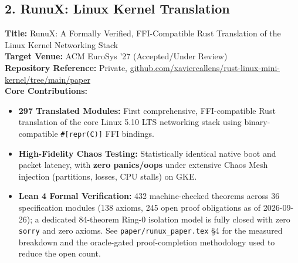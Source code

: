 \documentclass[11pt,a4paper]{article}
\begin{document}
\subsection{2. RunuX: Linux Kernel Translation}
\textbf{Title:} RunuX: A Formally Verified, FFI-Compatible Rust Translation of the Linux Kernel Networking Stack \\
\textbf{Target Venue:} ACM EuroSys '27 (Accepted/Under Review) \\
\textbf{Repository Reference:} Private, \url{github.com/xaviercallens/rust-linux-mini-kernel/tree/main/paper} \\
\textbf{Core Contributions:}
\begin{itemize}
    \item \textbf{297 Translated Modules:} First comprehensive, FFI-compatible Rust translation of the core Linux 5.10 LTS networking stack using binary-compatible \texttt{\#[repr(C)]} FFI bindings.
    \item \textbf{High-Fidelity Chaos Testing:} Statistically identical native boot and packet latency, with \textbf{zero panics/oops} under extensive Chaos Mesh injection (partitions, losses, CPU stalls) on GKE.
    \item \textbf{Lean 4 Formal Verification:} 432 machine-checked theorems across 36 specification modules (138 axioms, 245 open proof obligations as of 2026-09-26); a dedicated 84-theorem Ring-0 isolation model is fully closed with zero \texttt{sorry} and zero axioms. See \texttt{paper/runux\_paper.tex} \S4 for the measured breakdown and the oracle-gated proof-completion methodology used to reduce the open count.
\end{itemize}
\end{document}
